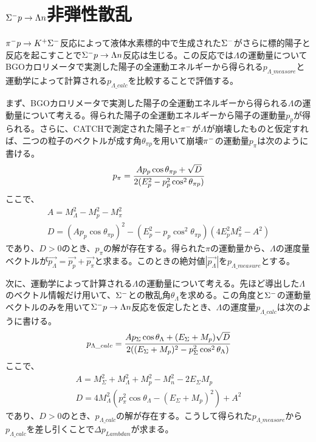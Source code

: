 \section{$\Sigma^{-} p\rightarrow \Lambda n$非弾性散乱}
$\pi^{-} p\rightarrow K^{+}\Sigma^{-}$反応によって液体水素標的中で生成された$\Sigma^{-}$がさらに標的陽子と反応を起こすことで$\Sigma^{-} p\rightarrow \Lambda n$反応は生じる。この反応では$\Lambda$の運動量についてBGOカロリメータで実測した陽子の全運動エネルギーから得られる$p_{\Lambda\_measore}$と運動学によって計算される$p_{\Lambda\_calc}$を比較することで評価する。\par
まず、BGOカロリメータで実測した陽子の全運動エネルギーから得られる$\Lambda$の運動量について考える。得られた陽子の全運動エネルギーから陽子の運動量$p_{p}$が得られる。さらに、CATCHで測定された陽子と$\pi^{-}$が$\Lambda$が崩壊したものと仮定すれば、二つの粒子のベクトルが成す角$\theta_{\pi p}$を用いて崩壊$\pi^{-}$の運動量$p_{\pi}$は次のように書ける。
\begin{equation}
p_{\pi} = \cfrac{Ap_{p}\cos\theta_{\pi p}+\sqrt{D}}{2(E^{2}_{p}-p^2_{p}\cos^{2}\theta_{\pi p})}
\end{equation}
ここで、
\begin{gather}
A = M^2_{\Lambda}-M^2_{p}-M^2_{\pi}\\
D = (Ap_{p}\cos\theta_{\pi p})^2-(E^{2}_{p}-p_{p}\cos^2\theta_{\pi p})(4E^2_{p}M^2_{\pi}-A^2)
\end{gather}
であり、$D>0$のとき、$p_{\pi}$の解が存在する。得られた$\pi$の運動量から、$\Lambda$の運度量ベクトルが$\overrightarrow{p_{\Lambda}}=\overrightarrow{p_{p}}+\overrightarrow{p_{\pi}}$と求まる。このときの絶対値$|\overrightarrow{p_{\Lambda}}|$を$p_{\Lambda\_measure}$とする。\par
次に、運動学によって計算される$\Lambda$の運動量について考える。先ほど導出した$\Lambda$のベクトル情報だけ用いて、$\Sigma^{-}$との散乱角$\theta_{\Lambda}$を求める。この角度と$\Sigma^{-}$の運動量ベクトルのみを用いて$\Sigma^{-} p\rightarrow \Lambda n$反応を仮定したとき、$\Lambda$の運度量$p_{\Lambda\_calc}$は次のように書ける。
\begin{equation}
p_{\Lambda\_calc} = \cfrac{Ap_{\Sigma}\cos\theta_{\Lambda}+(E_{\Sigma}+M_{p})\sqrt{D}}{2((E_{\Sigma}+M_{p})^{2}-p^2_{\Sigma}\cos^{2}\theta_{\Lambda})}
\end{equation}
ここで、
\begin{gather}
A = M^2_{\Sigma}+M^2_{\Lambda}+M^2_{p}-M^2_{n}-2E_{\Sigma}M_{p}\\
D = 4M^2_{\Lambda}(p^2_{\pi}\cos\theta_{\Lambda}-(E_{\Sigma}+M_{p})^{2})+A^2
\end{gather}
であり、$D>0$のとき、$p_{\Lambda\_calc}$の解が存在する。こうして得られた$p_{\Lambda\_measore}$から$p_{\Lambda\_calc}$を差し引くことで$\Delta p_{Lambda n}$が求まる。
